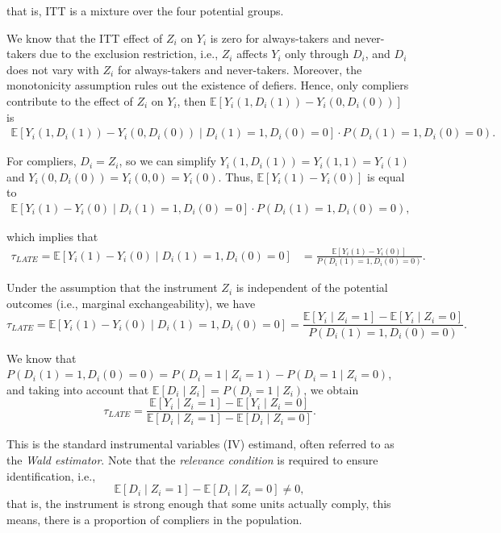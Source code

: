 that is, ITT is a mixture over the four potential groups.

We know that the ITT effect of $Z_i$ on $Y_i$ is zero for always-takers and never-takers due to the exclusion restriction, i.e., $Z_i$ affects $Y_i$ only through $D_i$, and $D_i$ does not vary with $Z_i$ for always-takers and never-takers. Moreover, the monotonicity assumption rules out the existence of defiers. Hence, only compliers contribute to the effect of $Z_i$ on $Y_i$, then $\mathbb{E}[Y_i(1,D_i(1))-Y_i(0,D_i(0))]$ is
\begin{align*}
	 \mathbb{E}[Y_i(1,D_i(1)) - Y_i(0,D_i(0)) \mid D_i(1)=1, D_i(0)=0] \cdot P(D_i(1)=1, D_i(0)=0).
\end{align*}

For compliers, $D_i = Z_i$, so we can simplify $Y_i(1,D_i(1)) = Y_i(1,1) = Y_i(1)$ and $Y_i(0,D_i(0)) = Y_i(0,0) = Y_i(0)$. Thus, $\mathbb{E}[Y_i(1) - Y_i(0)]$ is equal to
\begin{align*}
	\mathbb{E}[Y_i(1) - Y_i(0) \mid D_i(1) = 1, D_i(0) = 0] \cdot P(D_i(1) = 1, D_i(0) = 0),
\end{align*}

which implies that
\begin{align*}
	\tau_{LATE} = \mathbb{E}[Y_i(1) - Y_i(0) \mid D_i(1) = 1, D_i(0) = 0] 
	&= \frac{\mathbb{E}[Y_i(1) - Y_i(0)]}{P(D_i(1) = 1, D_i(0) = 0)}.
\end{align*}

Under the assumption that the instrument \( Z_i \) is independent of the potential outcomes (i.e., marginal exchangeability), we have
\[
\tau_{LATE} = \mathbb{E}[Y_i(1) - Y_i(0) \mid D_i(1) = 1, D_i(0) = 0] 
= \frac{\mathbb{E}[Y_i \mid Z_i = 1] - \mathbb{E}[Y_i \mid Z_i = 0]}{P(D_i(1) = 1, D_i(0) = 0)}.
\]

We know that $P(D_i(1) = 1, D_i(0) = 0)=P(D_i = 1 \mid Z_i = 1) - P(D_i = 1 \mid Z_i = 0)$, and taking into account that \( \mathbb{E}[D_i \mid Z_i] = P(D_i = 1 \mid Z_i) \), we obtain
\[
\tau_{LATE} = \frac{\mathbb{E}[Y_i \mid Z_i = 1] - \mathbb{E}[Y_i \mid Z_i = 0]}{\mathbb{E}[D_i \mid Z_i = 1] - \mathbb{E}[D_i \mid Z_i = 0]}.
\]

This is the standard instrumental variables (IV) estimand, often referred to as the \textit{Wald estimator}. Note that the \textit{relevance condition} is required to ensure identification, i.e.,
\[
\mathbb{E}[D_i \mid Z_i = 1] - \mathbb{E}[D_i \mid Z_i = 0] \neq 0,
\]
that is, the instrument is strong enough that some units actually comply, this means, there is a proportion of compliers in the population.

